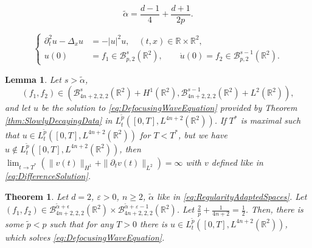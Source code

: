 \documentclass[10pt,a4paper]{amsart}
\newtheorem{lemma}{Lemma}
\newtheorem{theorem}{Theorem}
\newcommand{\R}{\mathbb{R}}
\newcommand {\Rtwo}{\mathbb{R}^{2}}
\begin{document}
\begin{equation}
\label{eq:RegularityAdaptedSpaces}
\tilde{\alpha} = \frac{d-1}{4} + \frac{d+1}{2p}.
\end{equation}

\begin{equation}
\label{eq:DefocusingWaveEquation}
\left\{ \begin{array}{cl}
\partial_t^2 u - \Delta_{x} u &= -|u|^2 u, \quad (t,x) \in \R \times \R^2, \\
u(0) &= f_1 \in \mathcal{B}^{s}_{p,2}(\R^2), \qquad \dot{u}(0) = f_2 \in \mathcal{B}^{s-1}_{p,2}(\R^2).
\end{array} \right.
\end{equation}

\begin{lemma}
\label{lem:BlowUpSlowerDecayingData}
Let $s > \tilde{\alpha}$, 
\[
(f_1,f_2) \in (\mathcal{B}^s_{4n+2,2,2}(\R^2) + H^1(\R^2),\mathcal{B}^{s-1}_{4n+2,2,2}(\R^2) + L^2(\R^2)),
\]
 and let $u$ be the solution to \eqref{eq:DefocusingWaveEquation} provided by Theorem \ref{thm:SlowlyDecayingData} in $L_t^{\tilde{p}}([0,T],L^{4n+2}(\R^2))$. If $T^*$ is maximal such that $u \in L_t^{\tilde{p}}([0,T],L^{4n+2}(\R^2))$ for $T < T^*$, but we have $u \notin L_t^{\tilde{p}}([0,T],L^{4n+2}(\R^2))$, then $\lim_{t \to T^*}(\| v(t) \|_{H^1} + \| \partial_t v(t) \|_{L^2}) = \infty$ with $v$ defined like in \eqref{eq:DifferenceSolution}.
\end{lemma}

\begin{theorem}
\label{thm:GWPSlowerDecay}
Let $d=2$, $\varepsilon >0$, $n \geq 2$, $\tilde{\alpha}$ like in \eqref{eq:RegularityAdaptedSpaces}. Let $(f_1,f_2) \in \mathcal{B}^{\tilde{\alpha}+\epsilon}_{4n+2,2,2}(\Rtwo) \times \mathcal{B}^{\tilde{\alpha}+\varepsilon - 1}_{4n+2,2,2}(\Rtwo)$. Let $\frac{2}{p} + \frac{1}{4n+2} = \frac{1}{2}$. Then, there is some $\tilde{p} < p$ such that for any $T > 0$ there is $u \in L_t^{\tilde{p}}([0,T],L^{4n+2}(\R^2))$, which solves \eqref{eq:DefocusingWaveEquation}.
\end{theorem}
\end{document}

